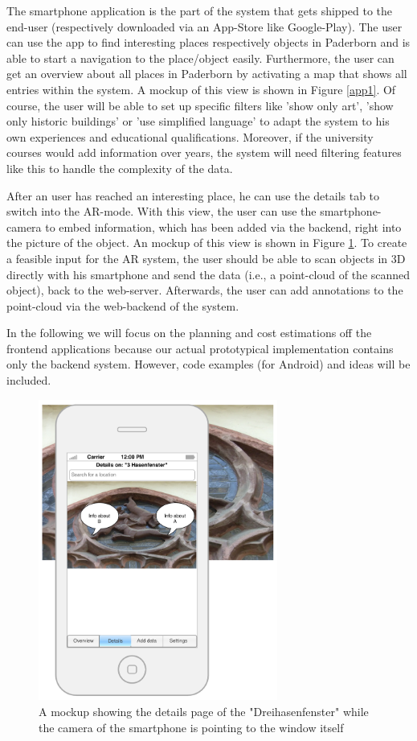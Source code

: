 The smartphone application is the part of the system that gets shipped to the end-user (respectively downloaded via an App-Store like Google-Play). The user can use the app to find interesting places respectively objects in Paderborn and is able to start a navigation to the place/object easily. Furthermore, the user can get an overview about all places in Paderborn by activating a map that shows all entries within the system. A mockup of this view is shown in Figure \ref{app1}. Of course, the user will be able to set up specific filters like 'show only art', 'show only historic buildings' or 'use simplified language' to adapt the system to his own experiences and educational qualifications. Moreover, if the university courses would add information over years, the system will need filtering features like this to handle the complexity of the data.

After an user has reached an interesting place, he can use the details tab to switch into the \ac{AR}-mode. With this view, the user can use the smartphone-camera to embed information, which has been added via the backend, right into the picture of the object. An mockup of this view is shown in Figure \ref{app2}. 
To create a feasible input for the \ac{AR} system, the user should be able to scan objects in 3D directly with his smartphone and send the data (i.e., a point-cloud of the scanned object), back to the web-server.  Afterwards, the user can add annotations to the point-cloud via the web-backend of the system. 

In the following we will focus on the planning and cost estimations off the frontend applications because our actual prototypical implementation contains only the backend system.  However, code examples (for Android) and ideas will be included. 

\begin{figure}[th]
\centerline{\includegraphics[width=0.7\textwidth]{gfx/mockup_app_2}}
\caption{A mockup showing the details page of the "Dreihasenfenster" while the camera of the smartphone is pointing to the window itself}
\label{app2}
\end{figure}			
  
